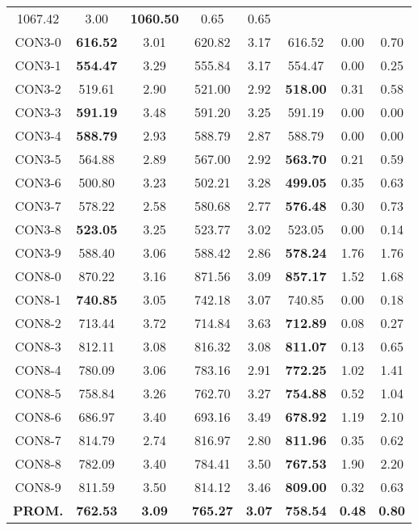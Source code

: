 \begin{table}[h]
\begin{tabular}{c c c c c c c c}
1067.42 & 3.00 & \bf{1060.50} & 
0.65 & 0.65\\CON3-0 & \bf{616.52} & 3.01 & 
620.82 & 3.17 & 616.52 & 0.00
 & 0.70\\CON3-1 & \bf{554.47} & 3.29 & 
555.84 & 3.17 & 554.47 & 0.00
 & 0.25\\CON3-2 & 519.61 & 2.90 & 
521.00 & 2.92 & \bf{518.00} & 
0.31 & 0.58\\CON3-3 & \bf{591.19} & 3.48 & 
591.20 & 3.25 & 591.19 & 0.00
 & 0.00\\CON3-4 & \bf{588.79} & 2.93 & 
588.79 & 2.87 & 588.79 & 0.00
 & 0.00\\
CON3-5 & 564.88 & 2.89 & 
567.00 & 2.92 & \bf{563.70} & 
0.21 & 0.59\\CON3-6 & 500.80 & 3.23 & 
502.21 & 3.28 & \bf{499.05} & 
0.35 & 0.63\\CON3-7 & 578.22 & 2.58 & 
580.68 & 2.77 & \bf{576.48} & 
0.30 & 0.73\\CON3-8 & \bf{523.05} & 3.25 & 
523.77 & 3.02 & 523.05 & 0.00
 & 0.14\\CON3-9 & 588.40 & 3.06 & 
588.42 & 2.86 & \bf{578.24} & 
1.76 & 1.76\\CON8-0 & 870.22 & 3.16 & 
871.56 & 3.09 & \bf{857.17} & 
1.52 & 1.68\\CON8-1 & \bf{740.85} & 3.05 & 
742.18 & 3.07 & 740.85 & 0.00
 & 0.18\\CON8-2 & 713.44 & 3.72 & 
714.84 & 3.63 & \bf{712.89} & 
0.08 & 0.27\\CON8-3 & 812.11 & 3.08 & 
816.32 & 3.08 & \bf{811.07} & 
0.13 & 0.65\\CON8-4 & 780.09 & 3.06 & 
783.16 & 2.91 & \bf{772.25} & 
1.02 & 1.41\\CON8-5 & 758.84 & 3.26 & 
762.70 & 3.27 & \bf{754.88} & 
0.52 & 1.04\\CON8-6 & 686.97 & 3.40 & 
693.16 & 3.49 & \bf{678.92} & 
1.19 & 2.10\\CON8-7 & 814.79 & 2.74 & 
816.97 & 2.80 & \bf{811.96} & 
0.35 & 0.62\\CON8-8 & 782.09 & 3.40 & 
784.41 & 3.50 & \bf{767.53} & 
1.90 & 2.20\\CON8-9 & 811.59 & 3.50 & 
814.12 & 3.46 & \bf{809.00} & 
0.32 & 0.63\\\bf{PROM.} & 
\bf{762.53} & \bf{3.09} & \bf{765.27} & \bf{3.07} & \bf{758.54} & \bf{0.48} & \bf{0.80}\\[1ex]\hline
\end{tabular}
\label{table:nonlin}
\end{table}
